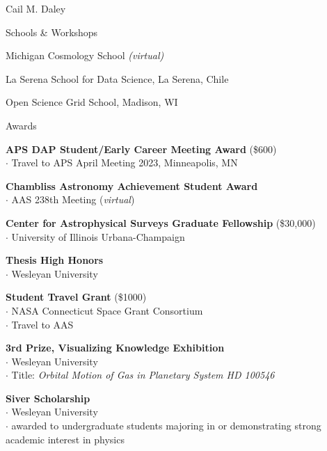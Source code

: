 \documentclass[11pt,a4paper]{article}
\begin{document}
\begin{cv}{Cail M. Daley}
  \begin{cvlist}{Schools \& Workshops}
  \item[2020] Michigan Cosmology School \textit{(virtual)}

  \item[2019] {La Serena School for Data Science}, La Serena, Chile

  \item[2019] {Open Science Grid School}, Madison, WI
  \end{cvlist}

  \newpage

  \settowidth{\cvlabelwidth}{\cvlabelfont 2018-2019}%
  \setlength{\cvlabelsep}{3em}
  \begin{cvlist}{Awards}

  \item[2023] \textbf{APS DAP Student/Early Career Meeting Award} (\$600) \\
    $\cdot$ Travel to APS April Meeting 2023, Minneapolis, MN

  \item[2021] \textbf{Chambliss Astronomy Achievement Student Award} \\
    $\cdot$ AAS 238th Meeting (\textit{virtual})

  \item[2019-2020] \textbf{Center for Astrophysical Surveys Graduate Fellowship}  (\$30,000) \\
    $\cdot$ University of Illinois Urbana-Champaign

  \item[2018] \textbf{Thesis High Honors} \\
    $\cdot$ Wesleyan University

  \item[2017] \textbf{Student Travel Grant} (\$1000) \\
    $\cdot$ NASA Connecticut Space Grant Consortium\\
    $\cdot$ Travel to AAS

  \item[2017]
    \textbf{3rd Prize, Visualizing Knowledge Exhibition} \\
    $\cdot$ Wesleyan University\\
    $\cdot$ Title: \textit{Orbital Motion of Gas in Planetary System HD 100546}

  \item[2017]
    \textbf{Siver Scholarship}\\
    $\cdot$ Wesleyan University\\
    $\cdot$ awarded to undergraduate students majoring in or demonstrating strong academic interest in physics


\end{cvlist}
\end{cv}
\end{document}

